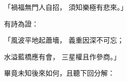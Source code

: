 \begin{showcontents}{}
「禍福無門人自招，  須知樂極有悲來。」

有詩為證：

「風波平地起蕭墻，  義重因深不可忘；

水溢藍橋應有會，  三星權且作參商。」

畢竟未知後來如何，且聽下回分解：





\end{showcontents}


